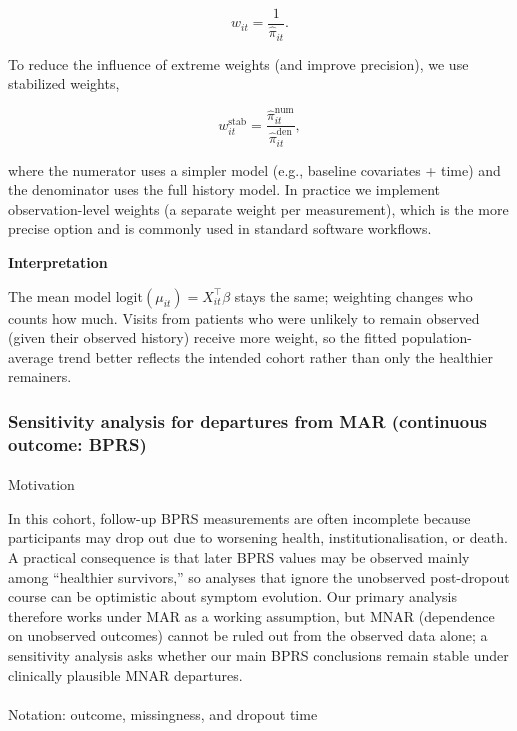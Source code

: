 \documentclass[
  9pt,
  letterpaper,
  DIV=11,
  numbers=noendperiod]{scrartcl}
\makeatletter
\let\oldparagraph\paragraph
\renewcommand{\paragraph}{
    \@ifstar
      \xxxParagraphStar
      \xxxParagraphNoStar
  }
\newcommand{\xxxParagraphStar}[1]{\oldparagraph*{#1}\mbox{}}
\newcommand{\xxxParagraphNoStar}[1]{\oldparagraph{#1}\mbox{}}
\makeatother
\begin{document}
\[
w_{it}=\frac{1}{\hat{\pi}_{it}}.
\]

To reduce the influence of extreme weights (and improve precision), we
use stabilized weights,

\[
w_{it}^{\text{stab}}=\frac{\hat{\pi}_{it}^{\text{num}}}{\hat{\pi}_{it}^{\text{den}}},
\]

where the numerator uses a simpler model (e.g., baseline covariates +
time) and the denominator uses the full history model. In practice we
implement observation-level weights (a separate weight per measurement),
which is the more precise option and is commonly used in standard
software workflows.

\textbf{Interpretation}

The mean model \(\text{logit}(\mu_{it})=X_{it}^\top\beta\) stays the
same; weighting changes who counts how much. Visits from patients who
were unlikely to remain observed (given their observed history) receive
more weight, so the fitted population-average trend better reflects the
intended cohort rather than only the healthier remainers.

\subsubsection{Sensitivity analysis for departures from MAR (continuous
outcome:
BPRS)}\label{sensitivity-analysis-for-departures-from-mar-continuous-outcome-bprs}

\paragraph{Motivation}\label{motivation}

In this cohort, follow-up BPRS measurements are often incomplete because
participants may drop out due to worsening health, institutionalisation,
or death. A practical consequence is that later BPRS values may be
observed mainly among ``healthier survivors,'' so analyses that ignore
the unobserved post-dropout course can be optimistic about symptom
evolution. Our primary analysis therefore works under MAR as a working
assumption, but MNAR (dependence on unobserved outcomes) cannot be ruled
out from the observed data alone; a sensitivity analysis asks whether
our main BPRS conclusions remain stable under clinically plausible MNAR
departures.

\paragraph{Notation: outcome, missingness, and dropout
time}\label{notation-outcome-missingness-and-dropout-time}
\end{document}

